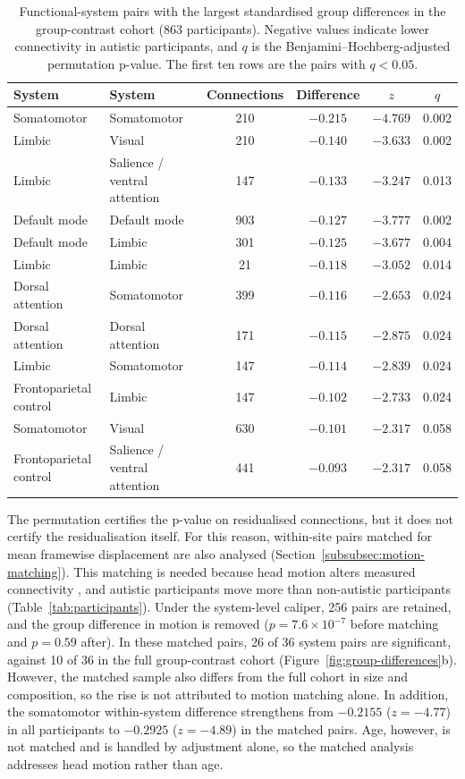 \begin{table}[t]
\centering
\caption{Functional-system pairs with the largest standardised group differences in the
group-contrast cohort (863 participants). Negative values indicate lower connectivity in
autistic participants, and $q$ is the Benjamini--Hochberg-adjusted permutation p-value.
The first ten rows are the pairs with $q<0.05$.}
\label{tab:system-pairs}
\small
\begin{tabular}{@{}llcccc@{}}
\toprule
System & System & Connections & Difference & $z$ & $q$ \\
\midrule
Somatomotor & Somatomotor & 210 & $-0.215$ & $-4.769$ & 0.002 \\
Limbic & Visual & 210 & $-0.140$ & $-3.633$ & 0.002 \\
Limbic & Salience / ventral attention & 147 & $-0.133$ & $-3.247$ & 0.013 \\
Default mode & Default mode & 903 & $-0.127$ & $-3.777$ & 0.002 \\
Default mode & Limbic & 301 & $-0.125$ & $-3.677$ & 0.004 \\
Limbic & Limbic & 21 & $-0.118$ & $-3.052$ & 0.014 \\
Dorsal attention & Somatomotor & 399 & $-0.116$ & $-2.653$ & 0.024 \\
Dorsal attention & Dorsal attention & 171 & $-0.115$ & $-2.875$ & 0.024 \\
Limbic & Somatomotor & 147 & $-0.114$ & $-2.839$ & 0.024 \\
Frontoparietal control & Limbic & 147 & $-0.102$ & $-2.733$ & 0.024 \\
Somatomotor & Visual & 630 & $-0.101$ & $-2.317$ & 0.058 \\
Frontoparietal control & Salience / ventral attention & 441 & $-0.093$ & $-2.317$ & 0.058 \\
\bottomrule
\end{tabular}
\end{table}

The permutation certifies the p-value on residualised connections, but it does not certify
the residualisation itself. For this reason, within-site pairs matched for mean framewise
displacement are also analysed (Section~\ref{subsubsec:motion-matching}). This matching is needed because
head motion alters measured connectivity \citep{Poweretal2012}, and autistic participants
move more than non-autistic participants (Table~\ref{tab:participants}). Under the
system-level caliper, 256 pairs are retained, and the group difference in motion is removed
($p=7.6\times10^{-7}$ before matching and $p=0.59$ after). In these matched pairs, 26 of 36
system pairs are significant, against 10 of 36 in the full group-contrast cohort
(Figure~\ref{fig:group-differences}b). However, the matched sample also differs from the full
cohort in size and composition, so the rise is not attributed to motion matching alone. In
addition, the somatomotor within-system difference strengthens from $-0.2155$ ($z=-4.77$)
in all participants to $-0.2925$ ($z=-4.89$) in the matched pairs. Age, however, is not
matched and is handled by adjustment alone, so the matched analysis addresses head motion
rather than age.

